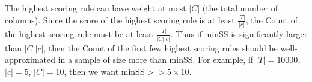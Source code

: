 The highest scoring rule can have weight at most $|C|$ (the total number of columns). Since the score of the highest scoring rule is at least $\frac{|T|}{|c|}$, the Count of the highest scoring rule must be at least $\frac{|T|}{|C||c|}$. Thus if minSS is significantly larger than $|C||c|$, then the Count of the first few highest scoring rules should be well-approximated in a sample of size more than minSS. For example, if $|T| = 10000$, $|c| = 5$, $|C| = 10$, then we want $\text{minSS} >> 5 \times 10$.
